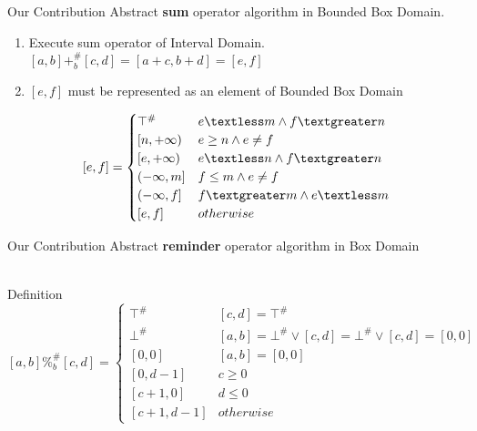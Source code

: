 \documentclass{beamer}
\begin{document}
	\begin{frame}{Our Contribution}
		Abstract \textbf{sum} operator algorithm in Bounded Box Domain.
		\begin{enumerate}
			\item Execute sum operator of Interval Domain. 
			$[a,b] +_{b}^\# [c,d] = [a + c,b + d] = [e,f]$
			\item $[e,f]$ must be represented as an element of Bounded Box Domain
		\end{enumerate}
	\[ [e,f] =
	\begin{cases} 
	\top^\# & e \textless m \land f \textgreater n\\
	[n,+\infty) & e \geq n  \land  e \neq f\\
	[e,+\infty) & e \textless n \land f \textgreater n\\
	(-\infty,m] & f \leq m \land e \neq f\\
	(-\infty,f] & f \textgreater m \land e \textless m \\
	[e,f] & otherwise
	\end{cases}
	\]
		
	\end{frame}
	\begin{frame}{Our Contribution}
	Abstract \textbf{reminder} operator algorithm in Box Domain\\~\\
		\begin{block}{Definition}
		\scriptsize	
		\[ [a,b] \%_{b}^\# [c,d] =
		\begin{cases}
		\top^\# & [c,d] = \top^\# \\
		\bot^\# & [a,b] = \bot^\# \lor [c,d] = \bot^\# \lor [c,d] = [0,0] \\ 
		[0,0] & [a,b] = [0,0] \\
		[0,d-1] & c \geq 0\\
		[c+1,0] & d \leq 0 \\
		[c+1,d-1] & otherwise
		\end{cases}
		\]
		\normalsize
	\end{block}
	
	\end{frame}
\end{document}
